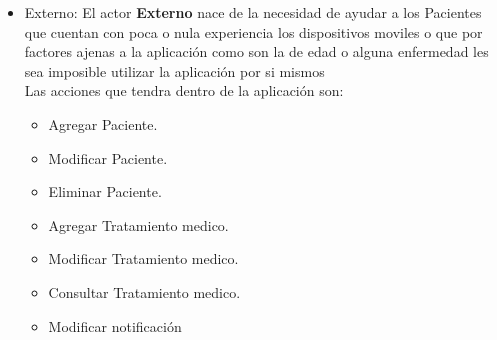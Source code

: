 \begin{itemize}
	\item Externo: El actor \textbf{Externo} nace de la necesidad de ayudar a los Pacientes que cuentan con poca o nula experiencia los dispositivos moviles o que por factores ajenas a la aplicación como son la de edad o alguna enfermedad les sea imposible utilizar la aplicación por si mismos\\
	Las acciones que tendra dentro de la aplicación son:
	\begin{itemize}
		\item Agregar Paciente.
		\item Modificar Paciente.
		\item Eliminar Paciente.
		\item Agregar Tratamiento medico.
		\item Modificar Tratamiento medico.
		\item Consultar Tratamiento medico.
		\item Modificar notificación
	\end{itemize}
\end{itemize}


